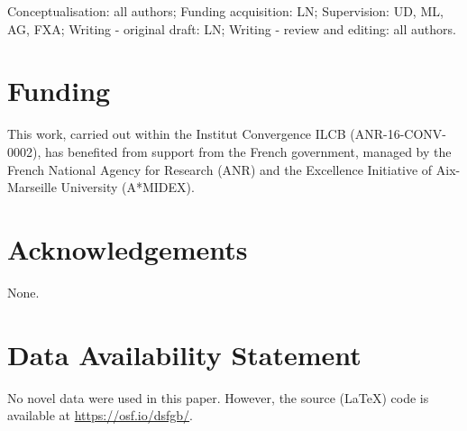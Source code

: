 \documentclass[utf8]{template/frontiersSCNS} %
\begin{document}

Conceptualisation: all authors; Funding acquisition: LN; Supervision: UD, ML, AG, FXA; Writing - original draft: LN; Writing - review and editing: all authors.

\section*{Funding}


This work, carried out within the Institut Convergence ILCB (ANR-16-CONV-0002), has benefited from support from the French government, managed by the French National Agency for Research (ANR) and the Excellence Initiative of Aix-Marseille University (A*MIDEX).

\section*{Acknowledgements}

None.



\section*{Data Availability Statement}

No novel data were used in this paper. However, the source (\LaTeX) code is available at \url{https://osf.io/dsfgb/}.


% 

\end{document}
